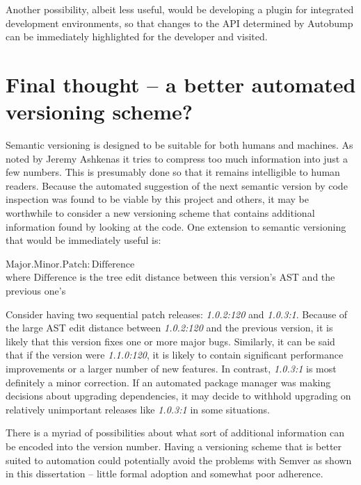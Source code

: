 \documentclass{l4proj}
\begin{document}
Another possibility, albeit less useful, would be developing a plugin
for integrated development environments, so that changes to the API
determined by Autobump can be immediately highlighted for the
developer and visited.

\section{Final thought -- a better automated versioning scheme?}

Semantic versioning is designed to be suitable for both humans and
machines. As noted by Jeremy Ashkenas \cite{WhySemanticVersioningIsnt}
it tries to compress too much information into just a few numbers.
This is presumably done so that it remains intelligible to human
readers. Because the automated suggestion of the next semantic version
by code inspection was found to be viable by this project and others,
it may be worthwhile to consider a new versioning scheme that contains
additional information found by looking at the code. One extension to
semantic versioning that would be immediately useful is:

\begin{center}
$\mathrm{Major.Minor.Patch}:\mathrm{Difference}$ \\
where $\mathrm{Difference}$ is the tree edit distance between this
version's AST and the previous one's
\end{center}

Consider having two sequential patch releases: \textit{1.0.2:120} and
\textit{1.0.3:1}. Because of the large AST edit distance between
\textit{1.0.2:120} and the previous version, it is likely that this
version fixes one or more major bugs. Similarly, it can be said that
if the version were \textit{1.1.0:120}, it is likely to contain
significant performance improvements or a larger number of new
features. In contrast, \textit{1.0.3:1} is most definitely a minor
correction. If an automated package manager was making decisions about
upgrading dependencies, it may decide to withhold upgrading on
relatively unimportant releases like \textit{1.0.3:1} in some
situations.

There is a myriad of possibilities about what sort of additional
information can be encoded into the version number. Having a
versioning scheme that is better suited to automation could
potentially avoid the problems with Semver as shown in this
dissertation -- little formal adoption and somewhat poor adherence.

\end{document}
